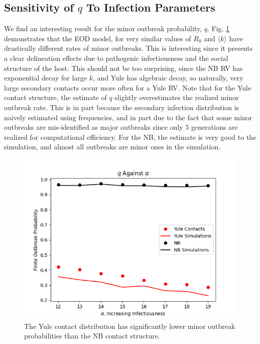 \documentclass[11pt, twocolumn]{article}
\begin{document}
\subsection*{Sensitivity of $q$ To Infection Parameters}
We find an interesting result for the minor outbreak probability, $q$. Fig. \ref{fig:minoroutbreaks} demonstrates that the EOD model, for very similar values of $R_0$ and $\langle k \rangle$ have drastically different rates of minor outbreaks. This is interesting since it presents a clear delineation effects due to pathogenic infectiousness and the social structure of the host. This should not be too surprising, since the NB RV has exponential decay for large $k$, and Yule has algebraic decay, so naturally, very large secondary contacts occur more often for a Yule RV. Note that for the Yule contact structure, the estimate of $q$ slightly overestimates the realized minor outbreak rate. This is in part because the secondary infection distribution is naively estimated using frequencies, and in part due to the fact that some minor outbreaks are mis-identified as major outbreaks since only $5$ generations are realized for computational efficiency. For the NB, the estimate is very good to the simulation, and almost all outbreaks are minor ones in the simulation.

\begin{figure}
	\centering
	\includegraphics[scale=0.5]{nb_yule_finite_outbreaks.png}
	\caption{The Yule contact distribution has significantly lower minor outbreak probabilities than the NB contact structure.}
	\label{fig:minoroutbreaks}
\end{figure}
\end{document}
